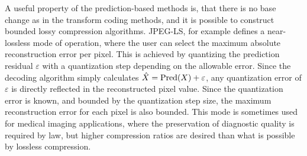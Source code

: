      A useful property of the prediction-based methods is, that there is no base change as in the transform coding methods, and it is possible to construct bounded lossy compression algorithms. JPEG-LS, for example defines a near-lossless mode of operation, where the user can select the maximum absolute reconstruction error per pixel. This is achieved by quantizing the prediction residual $\varepsilon$ with a quantization step depending on the allowable error. Since the decoding algorithm simply calculates $\hat{X} = \operatorname{Pred}(X) + \varepsilon$, any quantization error of $\varepsilon$ is directly reflected in the reconstructed pixel value. Since the quantization error is known, and bounded by the quantization step size, the maximum reconstruction error for each pixel is also bounded. This mode is sometimes used for medical imaging applications, where the preservation of diagnostic quality is required by law, but higher compression ratios are desired than what is possible by lossless compression.
  
  
  
  
  